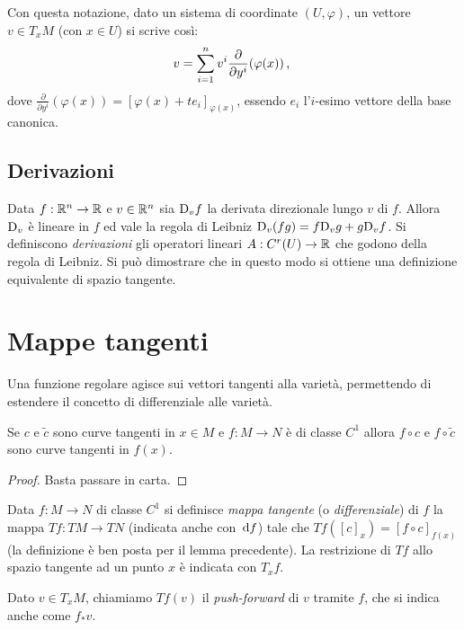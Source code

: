 Con questa notazione, dato un sistema di coordinate $(U,\varphi)$, un vettore $v\in T_x M$ (con $x\in U$) si scrive così:
\begin{equation*}
	v=\sum_{i=1}^nv^i\frac{\partial}{\partial y^i}(\varphi(x))\, \text{, }
\end{equation*}
dove $\frac{\partial}{\partial y^i}(\varphi(x))=[\varphi(x)+te_i]_{\varphi(x)}$, essendo $e_i$ l'$i$-esimo vettore della base canonica.

\subsection*{Derivazioni} 
Data $f:\mathbb R^n\to\mathbb R$ e $v\in\mathbb R^n$ sia $\mathrm D_vf$ la derivata direzionale lungo $v$ di $f$. Allora $\mathrm D_v$ è lineare in $f$ ed vale la regola di Leibniz $\mathrm D_v(fg)=f\mathrm D_vg+g\mathrm D_vf$. Si definiscono \emph{derivazioni} gli operatori lineari $A:C^r(U)\to\mathbb R$ che godono della regola di Leibniz. Si può dimostrare che in questo modo si ottiene una definizione equivalente di spazio tangente.
 
\section{Mappe tangenti}
Una funzione regolare agisce sui vettori tangenti alla varietà, permettendo di estendere il concetto di differenziale alle varietà.
 
\begin{lemma}
	Se $c$ e $\tilde{c}$ sono curve tangenti in $x\in M$ e $f:M\to N$ è di classe $C^1$ allora $f\circ c$ e $f\circ\tilde{c}$ sono curve tangenti in $f(x)$.
\end{lemma}

 \begin{proof}
  Basta passare in carta.
 \end{proof}

\begin{definition}  
	Data $f:M\to N$ di classe $C^1$ si definisce \emph{mappa tangente} (o \emph{differenziale}) di $f$ la mappa $Tf:TM\to TN$ (indicata anche con $\,\mathrm d f$) tale che $Tf([c]_x)=[f\circ c]_{f(x)}$ (la definizione è ben posta per il lemma precedente).
	La restrizione di $Tf$ allo spazio tangente ad un punto $x$ è indicata con $T_xf$.
\end{definition}

\begin{remark}
	Dato $v\in T_xM$, chiamiamo $Tf(v)$ il \emph{push-forward} di $v$ tramite $f$, che si indica anche come $f_*v$. 
\end{remark}


